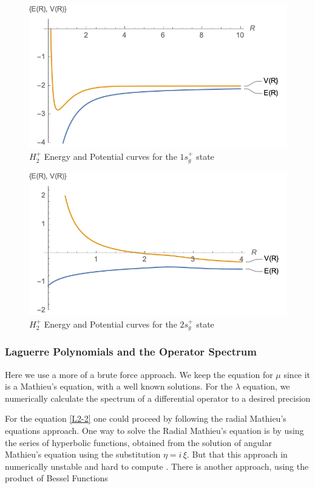 \begin{figure}
  \includegraphics{H2_1Sg-Potential.png}
  \caption{$ H_2^{+} $ Energy and Potential curves for the $ 1s_g^{+} $ state}
\end{figure}

\begin{figure}
  \includegraphics{H2_2Sg-Potential.png}
  \caption{$ H_2^{+} $ Energy and Potential curves for the $ 2s_g^{+} $ state}
\end{figure}


\subsubsection{Laguerre Polynomials and the Operator Spectrum}

Here we use a more of a brute force approach. We keep the equation for $ \mu $ since it is a Mathieu's equation, with a well known solutions. For the $ \lambda $ equation, we  numerically calculate the spectrum of a differential operator to a desired precision

For the equation \eqref{L2-2} one could proceed by following the radial Mathieu's equations approach. One way to solve the Radial Mathieu's equation is by using the series of hyperbolic functions, obtained from the solution of angular Mathieu's equation using the substitution $ \eta = i\,\xi$.  But that this approach in numerically unstable and hard to compute \cite{Mathieu4}. There is another approach, using the product of Bessel Functions \cite{Mathieu4}

